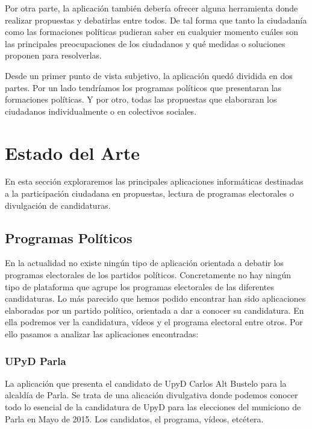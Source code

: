 Por otra parte, la aplicación también debería ofrecer alguna herramienta donde realizar propuestas y debatirlas entre todos. De tal forma que tanto la ciudadanía como las formaciones políticas pudieran saber en cualquier momento cuáles son las principales preocupaciones de los ciudadanos y qué medidas o soluciones proponen para resolverlas.

Desde un primer punto de vista subjetivo, la aplicación quedó dividida en dos partes. Por un lado tendríamos los programas políticos que presentaran las formaciones políticas. Y por otro, todas las propuestas que elaboraran los ciudadanos individualmente o en colectivos sociales.

\section{Estado del Arte}

En esta sección exploraremos las principales aplicaciones informáticas destinadas a la participación ciudadana en propuestas, lectura de programas electorales o divulgación de candidaturas.

\subsection{Programas Políticos}

En la actualidad no existe ningún tipo de aplicación orientada a debatir los programas electorales de los partidos políticos. Concretamente no hay ningún tipo de plataforma que agrupe los programas electorales de las diferentes candidaturas.
Lo más parecido que hemos podido encontrar han sido aplicaciones elaboradas por un partido político, orientada a dar a conocer su candidatura. En ella podremos ver la candidatura, vídeos y el programa electoral entre otros. Por ello pasamos a analizar las aplicaciones encontradas:

\subsubsection{UPyD Parla}
La aplicación que presenta el candidato de UpyD Carlos Alt Bustelo para la alcaldía de Parla. Se trata de una alicación divulgativa donde podemos conocer todo lo esencial de la candidatura de UpyD para las elecciones del municiono de Parla en Mayo de 2015. Los candidatos, el programa, vídeos, etcétera.

